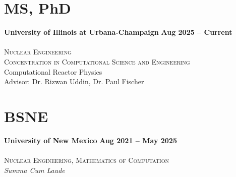\section{\mysidestyle MS, PhD}
\textbf{University of Illinois at Urbana-Champaign} \hfill \textbf{Aug 2025 -- Current}\vspace{-3mm}\\\vspace{-1mm}\\
\textsc{Nuclear Engineering \\Concentration in Computational Science and Engineering}\hfill \\
\hspace*{2mm} Computational Reactor Physics \\
\hspace*{2mm} Advisor:  Dr. Rizwan Uddin, Dr. Paul Fischer

\section{\mysidestyle BSNE}
\textbf{University of New Mexico} \hfill\textbf{Aug 2021 -- May 2025}\vspace{-3mm}\\\vspace{-1mm}\\
\textsc{Nuclear Engineering, Mathematics of Computation}\hfill\\
\textit{Summa Cum Laude}

